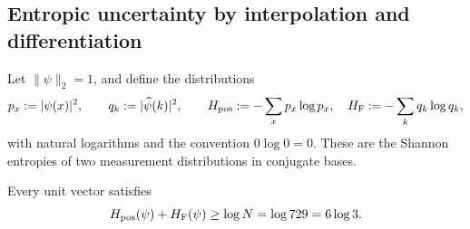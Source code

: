 \subsection{Entropic uncertainty by interpolation and differentiation}
\label{v:n19:sec:entropia}

Let \(\|\psi\|_2=1\), and define the distributions
\begin{equation}
 p_x:=|\psi(x)|^2,\qquad q_k:=|\widehat\psi(k)|^2,
 \qquad
 H_{\rm pos}:=-\sum_xp_x\log p_x,\quad
 H_{\rm F}:=-\sum_kq_k\log q_k,
 \label{v:n19:eq:entropias-distribucion}
\end{equation}
with natural logarithms and the convention \(0\log0=0\). These are the
Shannon entropies of two measurement distributions in conjugate bases.

\begin{theorem}
\label{v:n19:thm:entropia}
Every unit vector satisfies
\begin{equation}
 H_{\rm pos}(\psi)+H_{\rm F}(\psi)
 \ge\log N=\log729=6\log3.
 \label{v:n19:eq:cota-entropica}
\end{equation}
\end{theorem}
